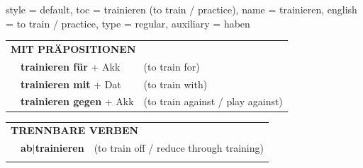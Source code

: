 \begin{verbentry}{
  style = {default},
  toc = {trainieren (to train / practice)},
  name = {trainieren},
  english = {to train / practice},
  type = {regular},
  auxiliary = {haben}
}
   \vspace{10pt}

   \begin{tabular}{lll}
      \multicolumn{3}{l}{\textbf{MIT PRÄPOSITIONEN}}\\
& \textbf{trainieren für} + Akk & (to train for)\\
& \textbf{trainieren mit} + Dat & (to train with)\\
& \textbf{trainieren gegen} + Akk & (to train against / play against)\\
\end{tabular}
  \hfill
   \begin{tabular}{lll}
      \multicolumn{3}{l}{\textbf{TRENNBARE VERBEN}}\\
 & \textbf{ab$|$trainieren} & (to train off / reduce through training)\\
\vspace{20pt}
  \end{tabular}
  \vspace{-5pt}
\end{verbentry}

